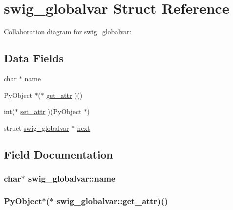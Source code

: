 \hypertarget{structswig__globalvar}{
\section{swig\_\-globalvar Struct Reference}
\label{structswig__globalvar}
}
Collaboration diagram for swig\_\-globalvar:\subsection*{Data Fields}
\begin{CompactItemize}
\item 
char $\ast$ \hyperlink{structswig__globalvar_32fcb5efb741f97e5c53e1a253cafdd9}{name}
\item 
PyObject $\ast$($\ast$ \hyperlink{structswig__globalvar_b4a0b077b1aaf10b91028de8f6502e86}{get\_\-attr} )()
\item 
int($\ast$ \hyperlink{structswig__globalvar_494e3d5a5f1fb694b7738fdd1ffdd657}{set\_\-attr} )(PyObject $\ast$)
\item 
struct \hyperlink{structswig__globalvar}{swig\_\-globalvar} $\ast$ \hyperlink{structswig__globalvar_6b7f8fdec3a5c39a52b33c916d7ba028}{next}
\end{CompactItemize}


\subsection{Field Documentation}
\hypertarget{structswig__globalvar_32fcb5efb741f97e5c53e1a253cafdd9}{
\subsubsection{\setlength{\rightskip}{0pt plus 5cm}char$\ast$ {\bf swig\_\-globalvar::name}}}
\label{structswig__globalvar_32fcb5efb741f97e5c53e1a253cafdd9}


\hypertarget{structswig__globalvar_b4a0b077b1aaf10b91028de8f6502e86}{
\subsubsection{\setlength{\rightskip}{0pt plus 5cm}PyObject$\ast$($\ast$ {\bf swig\_\-globalvar::get\_\-attr})()}}
\label{structswig__globalvar_b4a0b077b1aaf10b91028de8f6502e86}


